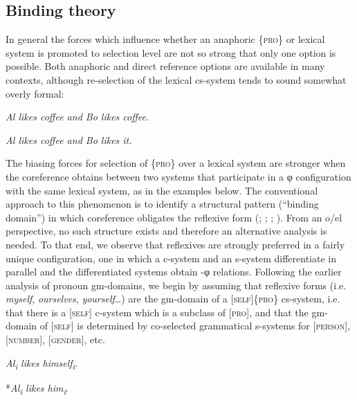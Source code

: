 \subsection{Binding theory}

In general the forces which influence whether an anaphoric \{\textsc{pro}\} or lexical system is promoted to selection level are not so strong that only one option is possible. Both anaphoric and direct reference options are available in many contexts, although re-selection of the lexical cs-system tends to sound somewhat overly formal:

    \textit{Al likes coffee and Bo likes coffee.}

    \textit{Al likes coffee and Bo likes it.}

  The biasing forces for selection of \{\textsc{pro}\} over a lexical system are stronger when the coreference obtains between two systems that participate in a φ configuration with the same lexical system, as in the examples below. The conventional approach to this phenomenon is to identify a structural pattern (“binding domain”) in which coreference obligates the reflexive form (\citealt{Chomsky19821993}; \citealt{Haegeman1994}; \citealt{Reinhart1976}; \citealt{Safir2004}). From an o/el perspective, no such structure exists and therefore an alternative analysis is needed. To that end, we observe that reflexives are strongly preferred in a fairly unique configuration, one in which a c-system and an s-system differentiate in parallel and the differentiated systems obtain -φ relations. Following the earlier analysis of pronoun gm-domains, we begin by assuming that reflexive forms (i.e. \textit{myself}, \textit{ourselves}, \textit{yourself}…) are the gm-domain of a [\textsc{self}]\{\textsc{pro}\} cs-system, i.e. that there is a [\textsc{self}] c-system which is a subclass of [\textsc{pro}], and that the gm-domain of [\textsc{self}] is determined by co-selected grammatical s-systems for [\textsc{person}], [\textsc{number}], [\textsc{gender}], etc. 

\textit{Al\textsubscript{i} likes himself\textsubscript{i}}.      

*\textit{Al\textsubscript{i} likes him\textsubscript{i}}.        

